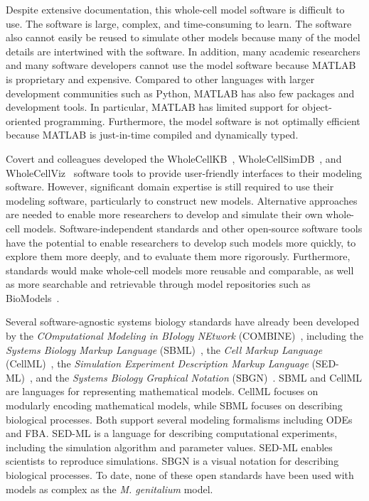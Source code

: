 \documentclass[journal,transmag]{IEEEtran}
\begin{document}
Despite extensive documentation, this whole-cell model software is difficult to use. The software is large, complex, and time-consuming to learn. The software also cannot easily be reused to simulate other models because many of the model details are intertwined with the software. In addition, many academic researchers and many software developers cannot use the model software because MATLAB is proprietary and expensive. Compared to other languages with larger development communities such as Python, MATLAB has also few packages and development tools. In particular, MATLAB has limited support for object-oriented programming. Furthermore, the model software is not optimally efficient because MATLAB is just-in-time compiled and dynamically typed.

Covert and colleagues developed the WholeCellKB~\cite{Karr2013}, WholeCellSimDB~\cite{Karr2014}, and WholeCellViz~\cite{Lee2013} software tools to provide user-friendly interfaces to their modeling software. However, significant domain expertise is still required to use their modeling software, particularly to construct new models. Alternative approaches are needed to enable more researchers to develop and simulate their own whole-cell models. Software-independent standards and other open-source software tools have the potential to enable researchers to develop such models more quickly, to explore them more deeply, and to evaluate them more rigorously. Furthermore, standards would make whole-cell models more reusable and comparable, as well as more searchable and retrievable through model repositories such as BioModels~\cite{juty2015biomodels,chelliah2015biomodels}.

Several software-agnostic systems biology standards have already been developed by the \emph{COmputational Modeling in BIology NEtwork} (COMBINE)~\cite{le2011meeting}, including the \emph{Systems Biology Markup Language} (SBML)~\cite{hucka2003}, the \emph{Cell Markup Language} (CellML)~\cite{hedley_2001b}, the \emph{Simulation Experiment Description Markup Language} (SED-ML)~\cite{sedml2011}, and the \emph{Systems Biology Graphical Notation} (SBGN)~\cite{LeNovereHMMSS09}. SBML and CellML are languages for representing mathematical models. CellML focuses on modularly encoding mathematical models, while SBML focuses on describing biological processes. Both support several modeling formalisms including ODEs and FBA. SED-ML is a language for describing computational experiments, including the simulation algorithm and parameter values. SED-ML enables scientists to reproduce simulations. SBGN is a visual notation for describing biological processes. To date, none of these open standards have been used with models as complex as the \textit{M. genitalium} model.
\end{document}
